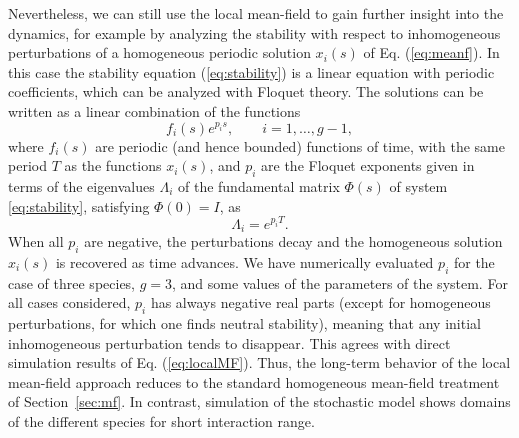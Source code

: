 Nevertheless, we can still use the local mean-field to gain
further insight into the dynamics, for example by analyzing the
stability with respect to inhomogeneous perturbations of a
homogeneous periodic solution $x_i(s)$ of Eq. (\ref{eq:meanf}).
In this case the stability equation (\ref{eq:stability}) is a
linear equation with periodic coefficients, which can be
analyzed with Floquet theory. The solutions can be written as a
linear combination of the functions \cite{gl94}
\begin{equation}
  f_i(s)e^{p_i s},\qquad i=1,\dots,g-1,
\end{equation}
where $f_i(s)$ are periodic (and hence bounded) functions of
time, with the same period $T$ as the functions $x_i(s)$, and
$p_i$ are the Floquet exponents given in terms of the
eigenvalues $\Lambda_i$ of the fundamental matrix $\Phi(s)$ of
system \eqref{eq:stability}, satisfying $\Phi(0)=I$, as
\begin{equation}
  \Lambda_i=e^{p_i T}.
\end{equation}
When all $p_i$ are negative, the perturbations decay and the
homogeneous solution $x_i(s)$ is recovered as time advances. We
have numerically evaluated $p_i$ for the case of three species,
$g=3$, and some values of the parameters of the system. For all
cases considered, $p_i$ has always negative real parts (except
for homogeneous perturbations, for which one finds neutral
stability), meaning that any initial inhomogeneous perturbation
tends to disappear. This agrees with direct simulation results
of Eq. (\ref{eq:localMF}). Thus, the long-term behavior of the local mean-field approach 
reduces to the standard homogeneous mean-field
treatment of Section~\ref{sec:mf}. In contrast, simulation of the
stochastic model shows domains of the different species for
short interaction range.

